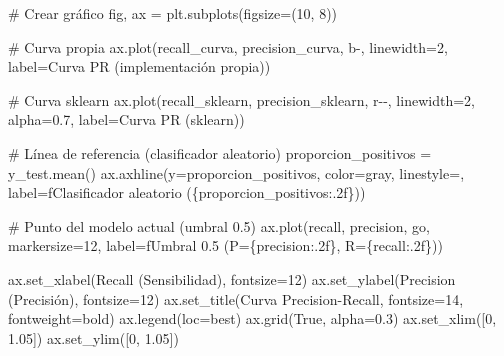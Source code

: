 \documentclass[
  doc,
  floatsintext,
  longtable,
  a4paper,
  nolmodern,
  notxfonts,
  notimes,
  12pt,
  colorlinks=true,linkcolor=blue,citecolor=blue,urlcolor=blue]{apa7}
\newenvironment{Shaded}{\begin{snugshade}}{\end{snugshade}}
\newcommand{\CommentTok}[1]{\textcolor[rgb]{0.37,0.37,0.37}{#1}}
\newcommand{\DecValTok}[1]{\textcolor[rgb]{0.68,0.00,0.00}{#1}}
\newcommand{\FloatTok}[1]{\textcolor[rgb]{0.68,0.00,0.00}{#1}}
\newcommand{\NormalTok}[1]{\textcolor[rgb]{0.00,0.23,0.31}{#1}}
\newcommand{\OperatorTok}[1]{\textcolor[rgb]{0.37,0.37,0.37}{#1}}
\newcommand{\SpecialCharTok}[1]{\textcolor[rgb]{0.37,0.37,0.37}{#1}}
\newcommand{\SpecialStringTok}[1]{\textcolor[rgb]{0.13,0.47,0.30}{#1}}
\newcommand{\StringTok}[1]{\textcolor[rgb]{0.13,0.47,0.30}{#1}}
\newcommand{\VariableTok}[1]{\textcolor[rgb]{0.07,0.07,0.07}{#1}}
\begin{document}
\begin{Shaded}
\begin{Highlighting}[]
\CommentTok{\# Crear gráfico}
\NormalTok{fig, ax }\OperatorTok{=}\NormalTok{ plt.subplots(figsize}\OperatorTok{=}\NormalTok{(}\DecValTok{10}\NormalTok{, }\DecValTok{8}\NormalTok{))}

\CommentTok{\# Curva propia}
\NormalTok{ax.plot(recall\_curva, precision\_curva, }\StringTok{\textquotesingle{}b{-}\textquotesingle{}}\NormalTok{, linewidth}\OperatorTok{=}\DecValTok{2}\NormalTok{, }
\NormalTok{        label}\OperatorTok{=}\StringTok{\textquotesingle{}Curva PR (implementación propia)\textquotesingle{}}\NormalTok{)}

\CommentTok{\# Curva sklearn}
\NormalTok{ax.plot(recall\_sklearn, precision\_sklearn, }\StringTok{\textquotesingle{}r{-}{-}\textquotesingle{}}\NormalTok{, linewidth}\OperatorTok{=}\DecValTok{2}\NormalTok{, alpha}\OperatorTok{=}\FloatTok{0.7}\NormalTok{,}
\NormalTok{        label}\OperatorTok{=}\StringTok{\textquotesingle{}Curva PR (sklearn)\textquotesingle{}}\NormalTok{)}

\CommentTok{\# Línea de referencia (clasificador aleatorio)}
\NormalTok{proporcion\_positivos }\OperatorTok{=}\NormalTok{ y\_test.mean()}
\NormalTok{ax.axhline(y}\OperatorTok{=}\NormalTok{proporcion\_positivos, color}\OperatorTok{=}\StringTok{\textquotesingle{}gray\textquotesingle{}}\NormalTok{, linestyle}\OperatorTok{=}\StringTok{\textquotesingle{}{-}{-}\textquotesingle{}}\NormalTok{, }
\NormalTok{           label}\OperatorTok{=}\SpecialStringTok{f\textquotesingle{}Clasificador aleatorio (}\SpecialCharTok{\{}\NormalTok{proporcion\_positivos}\SpecialCharTok{:.2f\}}\SpecialStringTok{)\textquotesingle{}}\NormalTok{)}

\CommentTok{\# Punto del modelo actual (umbral 0.5)}
\NormalTok{ax.plot(recall, precision, }\StringTok{\textquotesingle{}go\textquotesingle{}}\NormalTok{, markersize}\OperatorTok{=}\DecValTok{12}\NormalTok{, }
\NormalTok{        label}\OperatorTok{=}\SpecialStringTok{f\textquotesingle{}Umbral 0.5 (P=}\SpecialCharTok{\{}\NormalTok{precision}\SpecialCharTok{:.2f\}}\SpecialStringTok{, R=}\SpecialCharTok{\{}\NormalTok{recall}\SpecialCharTok{:.2f\}}\SpecialStringTok{)\textquotesingle{}}\NormalTok{)}

\NormalTok{ax.set\_xlabel(}\StringTok{\textquotesingle{}Recall (Sensibilidad)\textquotesingle{}}\NormalTok{, fontsize}\OperatorTok{=}\DecValTok{12}\NormalTok{)}
\NormalTok{ax.set\_ylabel(}\StringTok{\textquotesingle{}Precision (Precisión)\textquotesingle{}}\NormalTok{, fontsize}\OperatorTok{=}\DecValTok{12}\NormalTok{)}
\NormalTok{ax.set\_title(}\StringTok{\textquotesingle{}Curva Precision{-}Recall\textquotesingle{}}\NormalTok{, fontsize}\OperatorTok{=}\DecValTok{14}\NormalTok{, fontweight}\OperatorTok{=}\StringTok{\textquotesingle{}bold\textquotesingle{}}\NormalTok{)}
\NormalTok{ax.legend(loc}\OperatorTok{=}\StringTok{\textquotesingle{}best\textquotesingle{}}\NormalTok{)}
\NormalTok{ax.grid(}\VariableTok{True}\NormalTok{, alpha}\OperatorTok{=}\FloatTok{0.3}\NormalTok{)}
\NormalTok{ax.set\_xlim([}\DecValTok{0}\NormalTok{, }\FloatTok{1.05}\NormalTok{])}
\NormalTok{ax.set\_ylim([}\DecValTok{0}\NormalTok{, }\FloatTok{1.05}\NormalTok{])}


\end{Highlighting}
\end{Shaded}
\end{document}
